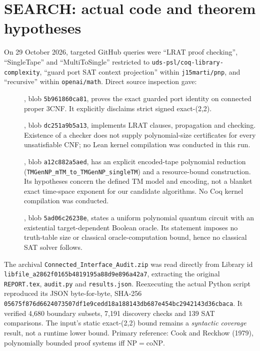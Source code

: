\documentclass[11pt]{article}
\begin{document}
\section{SEARCH: actual code and theorem hypotheses}
On 29 October 2026, targeted GitHub queries were ``LRAT proof checking'', ``SingleTape'' and ``MultiToSingle'' restricted to \texttt{uds-psl/coq-library-complexity}, ``guard port SAT context projection'' within \texttt{j15marti/pnp}, and ``recursive'' within \texttt{openai/math}. Direct source inspection gave:
\begin{description}
\item[], blob \texttt{5b961860ca81}, proves the exact guarded port identity on connected proper 3CNF. It explicitly disclaims strict signed exact-(2,2).
\item[], blob \texttt{dc251a9b5a13}, implements LRAT clauses, propagation and checking. Existence of a checker does not supply polynomial-size certificates for every unsatisfiable CNF; no Lean kernel compilation was conducted in this run.
\item[], blob \texttt{a12c882a5aed}, has an explicit encoded-tape polynomial reduction (\texttt{TMGenNP\_mTM\_to\_TMGenNP\_singleTM}) and a resource-bound construction. Its hypotheses concern the defined TM model and encoding, not a blanket exact time-space exponent for our candidate algorithms. No Coq kernel compilation was conducted.
\item[], blob \texttt{5ad06c26238e}, states a uniform polynomial quantum circuit with an existential target-dependent Boolean oracle. Its statement imposes no truth-table size or classical oracle-computation bound, hence no classical SAT solver follows.
\end{description}
The archival \texttt{Connected\_Interface\_Audit.zip} was read directly from Library id \texttt{libfile\_a2862f0165b4}\allowbreak\texttt{819195a88d9e896a42a7}, extracting the original \texttt{REPORT.tex}, \texttt{audit.py} and \texttt{results.json}. Reexecuting the actual Python script reproduced its JSON byte-for-byte, SHA-256 \texttt{05675f876d662407}\allowbreak\texttt{3507df1e9cedd18a}\allowbreak\texttt{188143db687e454b}\allowbreak\texttt{c2942143d36cbaca}. It verified 4,680 boundary subsets, 7,191 discovery checks and 139 SAT comparisons. The input's static exact-(2,2) bound remains a \emph{syntactic coverage} result, not a runtime lower bound. Primary reference: Cook and Reckhow (1979), polynomially bounded proof systems iff $\mathrm{NP}=\mathrm{coNP}$.
\end{document}
